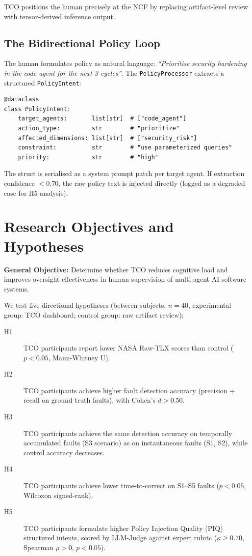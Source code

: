 \documentclass[manuscript,review,anonymous]{acmart}
\begin{document}
TCO positions the human precisely at the NCF by replacing artifact-level review with
tensor-derived inference output.

\subsection{The Bidirectional Policy Loop}

The human formulates policy as natural language: \textit{``Prioritise security
hardening in the code agent for the next 3 cycles''}. The
\texttt{PolicyProcessor} extracts a structured \texttt{PolicyIntent}:

\begin{lstlisting}[caption={PolicyIntent structured extraction}]
@dataclass
class PolicyIntent:
    target_agents:       list[str]  # ["code_agent"]
    action_type:         str        # "prioritize"
    affected_dimensions: list[str]  # ["security_risk"]
    constraint:          str        # "use parameterized queries"
    priority:            str        # "high"
\end{lstlisting}

\noindent The struct is serialised as a system prompt patch per target agent.
If extraction confidence $< 0.70$, the raw policy text is injected directly
(logged as a degraded case for H5 analysis).

\section{Research Objectives and Hypotheses}

\noindent \textbf{General Objective:} Determine whether TCO reduces cognitive load and
improves oversight effectiveness in human supervision of multi-agent AI software systems.

\smallskip
\noindent We test five directional hypotheses (between-subjects, $n = 40$,
experimental group: TCO dashboard; control group: raw artifact review):

\begin{description}
  \item[H1] TCO participants report lower NASA Raw-TLX scores than control
    ($p < 0.05$, Mann-Whitney U).
  \item[H2] TCO participants achieve higher fault detection accuracy
    (precision + recall on ground truth faults), with Cohen's $d > 0.50$.
  \item[H3] TCO participants achieve the same detection accuracy on
    temporally accumulated faults (S3 scenario) as on instantaneous faults (S1, S2),
    while control accuracy decreases.
  \item[H4] TCO participants achieve lower time-to-correct on S1--S5 faults
    ($p < 0.05$, Wilcoxon signed-rank).
  \item[H5] TCO participants formulate higher Policy Injection Quality (PIQ)
    structured intents, scored by LLM-Judge against expert rubric
    ($\kappa \geq 0.70$, Spearman $\rho > 0$, $p < 0.05$).
\end{description}
\end{document}
